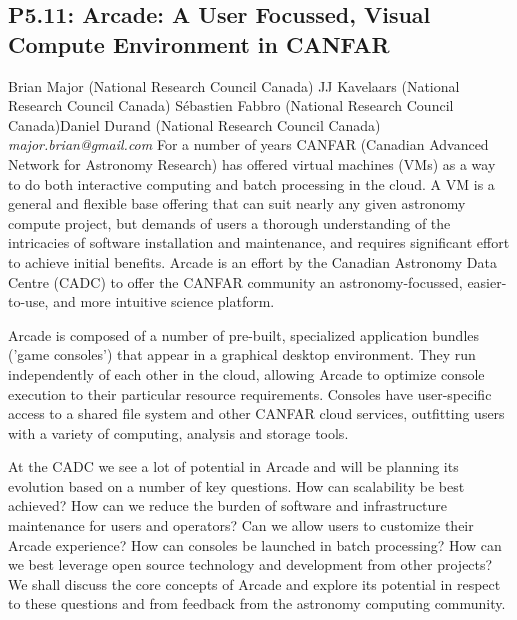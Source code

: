 \documentclass{report}
\begin{document}
\subsection*{P5.11: Arcade: A User Focussed, Visual Compute Environment in CANFAR}
\bigskip
Brian Major (National Research Council Canada) \newline JJ Kavelaars (National Research Council Canada) \newline  Sébastien Fabbro (National Research Council Canada)\newline  Daniel Durand (National Research Council Canada)\newline  \newline  \newline\newline
{\it major.brian@gmail.com}\newline
\newline\newline
For a number of years CANFAR (Canadian Advanced Network for Astronomy Research) has offered virtual machines (VMs) as a way to do both interactive computing and batch processing in the cloud.  A VM is a general and flexible base offering that can suit nearly any given astronomy compute project, but demands of users a thorough understanding of the intricacies of software installation and maintenance, and requires significant effort to achieve initial benefits.  Arcade is an effort by the Canadian Astronomy Data Centre (CADC) to offer the CANFAR community an astronomy-focussed, easier-to-use, and more intuitive science platform.

Arcade is composed of a number of pre-built, specialized application bundles ('game consoles') that appear in a graphical desktop environment.  They run independently of each other in the cloud, allowing Arcade to optimize console execution to their particular resource requirements.  Consoles have user-specific access to a shared file system and other CANFAR cloud services, outfitting users with a variety of computing, analysis and storage tools.

At the CADC we see a lot of potential in Arcade and will be planning its evolution based on a number of key questions.  How can scalability be best achieved?  How can we reduce the burden of software and infrastructure maintenance for users and operators?  Can we allow users to customize their Arcade experience?  How can consoles be launched in batch processing?  How can we best leverage open source technology and development from other projects?  We shall discuss the core concepts of Arcade and explore its potential in respect to these questions and from feedback from the astronomy computing community.\newline
\newpage
\end{document}

